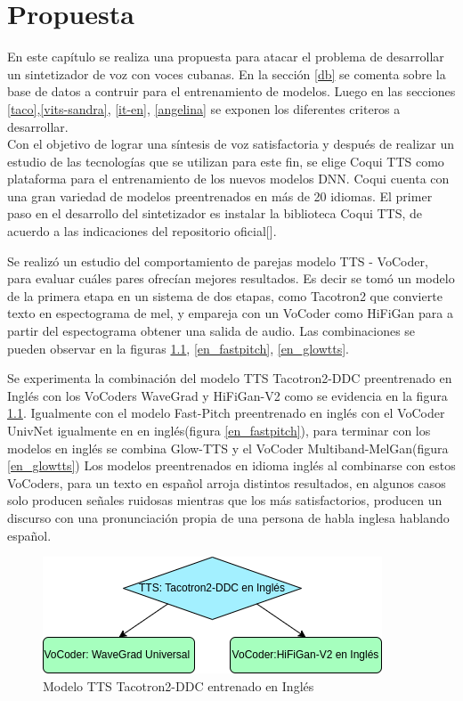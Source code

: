 \chapter{Propuesta}\label{chapter:proposal}
En este capítulo se realiza una propuesta para atacar el problema de desarrollar un sintetizador de voz con voces cubanas. En la sección \ref{db} se comenta sobre la base de datos a contruir para el entrenamiento de modelos. Luego en las secciones \ref{taco},\ref{vits-sandra}, \ref{it-en}, \ref{angelina} se exponen los diferentes criteros a desarrollar.\\

Con el objetivo de lograr una síntesis de voz satisfactoria y después de realizar un estudio de las tecnologías que se utilizan para este fin, se elige Coqui TTS como plataforma para el entrenamiento de los nuevos modelos DNN. Coqui cuenta con una gran variedad de modelos preentrenados en más de 20 idiomas.  
El primer paso en el desarrollo del sintetizador es instalar la biblioteca Coqui TTS, de acuerdo a las indicaciones del repositorio oficial[\cite{coqui-doc}].

 Se realizó un estudio del comportamiento de parejas modelo TTS - VoCoder, para evaluar cuáles pares ofrecían mejores resultados. Es decir se tomó un modelo de la primera etapa en un sistema de dos etapas, como Tacotron2 que convierte texto en espectograma de mel, y empareja con un VoCoder como HiFiGan para a partir del espectograma obtener una salida de audio. Las combinaciones se pueden observar en la figuras \ref{en_tacotron2}, \ref{en_fastpitch}, \ref{en_glowtts}.

Se experimenta la combinación del modelo TTS Tacotron2-DDC preentrenado en Inglés con los VoCoders WaveGrad y HiFiGan-V2 como se evidencia en la figura \ref{en_tacotron2}. Igualmente con el modelo Fast-Pitch preentrenado en inglés con el VoCoder UnivNet igualmente en  en inglés(figura \ref{en_fastpitch}), para terminar con los modelos en inglés se combina Glow-TTS y el VoCoder Multiband-MelGan(figura \ref{en_glowtts})
Los modelos preentrenados en idioma inglés al combinarse con estos VoCoders, para un texto en español arroja distintos resultados, en algunos casos solo producen señales ruidosas mientras que los más satisfactorios, producen un discurso con una pronunciación propia de una persona de habla inglesa hablando español.

\begin{figure}[H]
	\centering
	\includegraphics[width=0.6\linewidth]{Graphics/en_tacotron2}
	\caption{Modelo TTS Tacotron2-DDC entrenado en Inglés}
	\label{en_tacotron2}
\end{figure}

